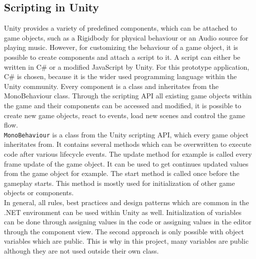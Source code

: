 \subsection{Scripting in Unity}
Unity provides a variety of predefined components, which can be attached to game objects, such as a Rigidbody for physical behaviour or an Audio source for playing music. However, for customizing the behaviour of a game object, it is possible to create components and attach a script to it. A script can either be written in C\# or a  modified JavaScript by Unity. For this prototype application, C\# is chosen, because it is the wider used programming language within the Unity community. Every component is a class and inheritates from the MonoBehaviour class. Through the scripting API all existing game objects within the game and their components can be accessed and modified, it is possible to create new game objects, react to events, load new scenes and control the game flow. \cite{?}\\
\texttt{MonoBehaviour} is a class from the Unity scripting API, which every game object inheritates from. It contains several methods which can be overwritten to execute code after various lifecycle events. The update method for example is called every frame update of the game object. It can be used  to get continues updated values from the game object for example. The start method is called once before the gameplay starts. This method is mostly used for initialization of other game objects or components. \cite{?}\\
In general, all rules, best practices and design patterns which are common in the .NET environment can be used within Unity as well. Initialization of variables can be done through assigning values in the code or assigning values in the editor through the component view. The second approach is only possible with object variables which are public. This is why in this project, many variables are public although they are not used outside their own class.
